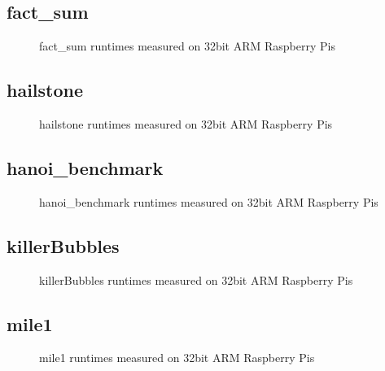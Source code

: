 \newpage
\subsection{fact\_sum}
    
    \begin{figure}[h]
	    \centering
		
        \caption{fact\_sum runtimes measured on 32bit ARM Raspberry Pis}
	\end{figure}
    


\newpage
\subsection{hailstone}
    
    \begin{figure}[h]
	    \centering
		
        \caption{hailstone runtimes measured on 32bit ARM Raspberry Pis}
	\end{figure}
    


\newpage
\subsection{hanoi\_benchmark}
    
    \begin{figure}[h]
	    \centering
		
        \caption{hanoi\_benchmark runtimes measured on 32bit ARM Raspberry Pis}
	\end{figure}
    


\newpage
\subsection{killerBubbles}
    
    \begin{figure}[h]
	    \centering
		
        \caption{killerBubbles runtimes measured on 32bit ARM Raspberry Pis}
	\end{figure}
    


\newpage
\subsection{mile1}
    
    \begin{figure}[h]
	    \centering
		
        \caption{mile1 runtimes measured on 32bit ARM Raspberry Pis}
	\end{figure}
    


